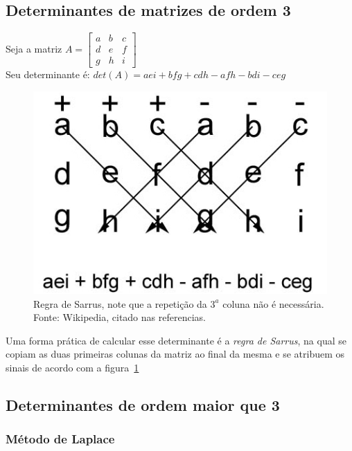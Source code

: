    \subsection{Determinantes de matrizes de ordem 3}
  
Seja a matriz $A=\begin{bmatrix}
     a & b & c\\d & e & f\\g & h & i
   \end{bmatrix}$\\
   Seu determinante é: $det(A)=aei+bfg+cdh-afh-bdi-ceg$\\
   \begin{figure}[t]
   \centering
     \includegraphics[scale=0.3]{Determinant_3x3-wikipedia.jpg}
     \caption{Regra de Sarrus, note que a repetição da $3^a$ coluna não é necessária. Fonte: Wikipedia, citado nas referencias.}
     \label{fig1}
   \end{figure}
Uma forma prática de calcular esse determinante é a \textit{regra de Sarrus}, na qual se copiam as duas primeiras 
colunas da matriz ao final da mesma e se atribuem os sinais de acordo com a figura~\ref{fig1}
   
   \subsection{Determinantes de ordem maior que 3}
   \subsubsection*{Método de Laplace}
